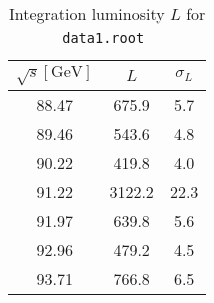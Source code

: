\begin{table}[ht]
	\centering
	\begin{tabular}{ccc}
		\toprule
	$\sqrt{s} [\si{\giga\eV}]$ &  $L$ &  $\sigma_L$ \\
	\midrule
	\num{88.47} & \num{675.9} & \num{5.7}\\
	\num{89.46} & \num{543.6} & \num{4.8}\\
	\num{90.22} & \num{419.8} & \num{4.0}\\
	\num{91.22} & \num{3122.2} & \num{22.3}\\
	\num{91.97} & \num{639.8} & \num{5.6}\\
	\num{92.96} & \num{479.2} & \num{4.5}\\
	\num{93.71} & \num{766.8} & \num{6.5}\\
	\bottomrule
	\end{tabular}
	\cprotect\caption{Integration luminosity $L$ for \verb|data1.root|~\cite{manual}}
	\label{tab:lumi}
\end{table}

